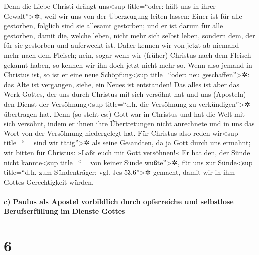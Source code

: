  Denn die Liebe Christi drängt uns\textless sup
title=``oder: hält uns in ihrer Gewalt''\textgreater✲, weil wir uns von
der Überzeugung leiten lassen: Einer ist für alle gestorben, folglich
sind sie allesamt gestorben;  und er ist darum für alle
gestorben, damit die, welche leben, nicht mehr sich selbst leben,
sondern dem, der für sie gestorben und auferweckt ist. 
Daher kennen wir von jetzt ab niemand mehr nach dem Fleisch; nein, sogar
wenn wir (früher) Christus nach dem Fleisch gekannt haben, so kennen wir
ihn doch jetzt nicht mehr so.  Wenn also jemand in
Christus ist, so ist er eine neue Schöpfung\textless sup title=``oder:
neu geschaffen''\textgreater✲: das Alte ist vergangen, siehe, ein Neues
ist entstanden!  Das alles ist aber das Werk Gottes, der
uns durch Christus mit sich versöhnt hat und uns (Aposteln) den Dienst
der Versöhnung\textless sup title=``d.h. die Versöhnung zu
verkündigen''\textgreater✲ übertragen hat.  Denn (so
steht es:) Gott war in Christus und hat die Welt mit sich versöhnt,
indem er ihnen ihre Übertretungen nicht anrechnete und in uns das Wort
von der Versöhnung niedergelegt hat.  Für Christus also
reden wir\textless sup title=``=~sind wir tätig''\textgreater✲ als seine
Gesandten, da ja Gott durch uns ermahnt; wir bitten für Christus: »Laßt
euch mit Gott versöhnen!«  Er hat den, der Sünde nicht
kannte\textless sup title=``=~von keiner Sünde wußte''\textgreater✲, für
uns zur Sünde\textless sup title=``d.h. zum Sündenträger; vgl. Jes
53,6''\textgreater✲ gemacht, damit wir in ihm Gottes Gerechtigkeit
würden.

\hypertarget{c-paulus-als-apostel-vorbildlich-durch-opferreiche-und-selbstlose-berufserfuxfcllung-im-dienste-gottes}{%
\paragraph{c) Paulus als Apostel vorbildlich durch opferreiche und
selbstlose Berufserfüllung im Dienste
Gottes}\label{c-paulus-als-apostel-vorbildlich-durch-opferreiche-und-selbstlose-berufserfuxfcllung-im-dienste-gottes}}

\hypertarget{section-5}{%
\section{6}\label{section-5}}

